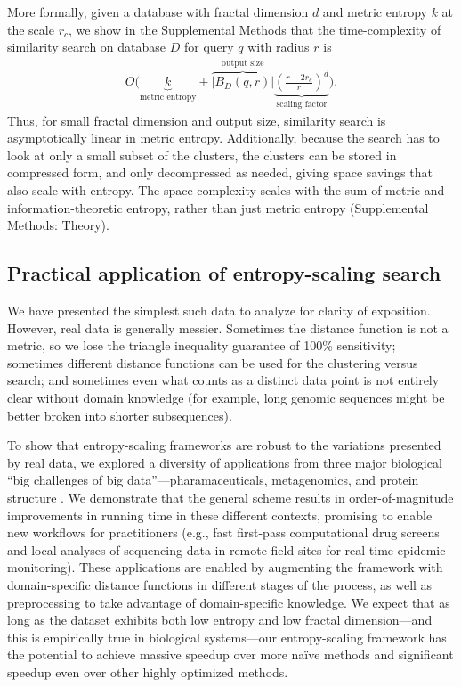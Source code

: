 \documentclass[11pt]{elsarticle}
\renewcommand{\cite}{\citep} %
\theoremstyle{definition}
\theoremstyle{remark}
\numberwithin{equation}{section}
\begin{document}
More formally, given a database with fractal dimension $d$ and metric entropy $k$ at the scale $r_c$, we show in the Supplemental Methods that the time-complexity of similarity search on database $D$ for query $q$ with radius $r$ is
\begin{gather*}
    O\Bigg(
    \underbrace{k}_{\textrm{metric entropy}} +
    \overbrace{\left|B_D(q,r)\right|}^{\textrm{output size}}
    \underbrace{\left(\frac{r+2r_c}{r}\right)^d}_{\textrm{scaling factor}}
     \Bigg) .
\end{gather*}
Thus, for small fractal dimension and output size, similarity search is asymptotically linear in metric entropy.
Additionally, because the search has to look at only a small subset of the clusters, the clusters can be stored in compressed form, and only decompressed as needed, giving space savings that also scale with entropy.
The space-complexity scales with the sum of metric and information-theoretic entropy, rather than just metric entropy 
(Supplemental Methods: Theory).

\subsection{Practical application of entropy-scaling search}
We have presented the simplest such data to analyze for clarity of exposition.
However, real data is generally messier.
Sometimes the distance function is not a metric, so we lose the triangle inequality guarantee of 100\% sensitivity;
sometimes different distance functions can be used for the clustering versus search;
and sometimes even what counts as a distinct data point is not entirely clear without domain knowledge (for example, long genomic sequences might be better broken into shorter subsequences).

To show that entropy-scaling frameworks are robust to the variations presented by real data,
we explored a diversity of applications from three major biological ``big challenges of big data''---pharamaceuticals, metagenomics, and protein structure \cite{marx2013biology}.
We demonstrate that the general scheme results in order-of-magnitude improvements in running time in these different contexts, promising to enable new workflows for practitioners (e.g., fast first-pass computational drug screens and local analyses of sequencing data in remote field sites for real-time epidemic monitoring).
These applications are enabled by augmenting the framework with domain-specific distance functions in different stages of the process, as well as preprocessing to take advantage of domain-specific knowledge.
We expect that as long as the dataset exhibits both low entropy and low 
fractal dimension---and this is empirically true in biological systems---our 
entropy-scaling framework has the potential to achieve massive speedup 
over more na\"ive methods and significant speedup even over other highly 
optimized methods.
\end{document}
